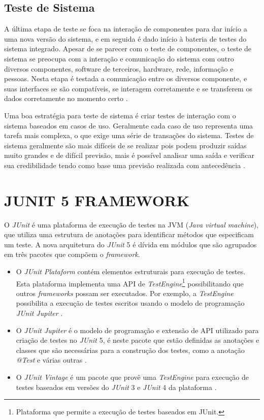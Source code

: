 \subsection{Teste de Sistema}

A última etapa de teste se foca na interação de componentes para dar início a uma nova versão do sistema, e em seguida é dado início à bateria de testes do sistema integrado. Apesar de se parecer com o teste de componentes, o teste de sistema se preocupa com a interação e comunicação do sistema com outro diversos componentes, software de terceiros, hardware, rede, informação e pessoas. Nesta etapa é testada a comunicação entre os diversos componente, e suas interfaces se são compatíveis, se interagem corretamente e se transferem os dados corretamente no momento certo \cite{SOMMER2011}.


Uma boa estratégia para teste de sistema é criar testes de interação com o sistema baseados em casos de uso. Geralmente cada caso de uso representa uma tarefa mais complexa, o que exige uma série de transações do sistema. Testes de sistema geralmente são mais difíceis de se realizar pois podem produzir saídas muito grandes e de difícil previsão, mais é possível analisar uma saída e verificar sua credibilidade tendo como base uma previsão realizada com antecedência \cite{SOMMER2011}.



\section{JUNIT 5 FRAMEWORK}

O  \textit{JUnit} é uma plataforma de execução de testes na JVM (\textit{Java virtual machine}), que utiliza uma estrutura de anotações para identificar métodos que especificam um teste. A nova arquitetura do \textit{JUnit} 5 é dívida em módulos que são agrupados em três pacotes que compõem o \textit{framework}. 

\begin{itemize}

\item O \textit{JUnit Plataform} contém elementos estruturais para execução de testes. Esta plataforma implementa uma API de \textit{TestEngine}\footnote{Plataforma que permite a execução de testes baseados em JUnit.} possibilitando que outros \textit{frameworks} possam ser executados. Por exemplo, a \textit{TestEngine} possibilita a execução de testes escritos usando o modelo de programação \textit{JUnit Jupiter} \cite{Junit}. 


\item O \textit{JUnit Jupiter} é o modelo de programação e extensão de API utilizado para criação de testes no \textit{JUnit} 5, é neste pacote que estão definidas as anotações e classes que são necessárias para a construção dos testes, como a anotação \textit{@Test} e várias outras \cite{Junit}.


\item O \textit{JUnit Vintage} é um pacote que provê uma \textit{TestEngine} para execução de testes baseados em versões do \textit{JUnit} 3 e \textit{JUnit} 4 da plataforma \cite{Junit}.


\end{itemize}


